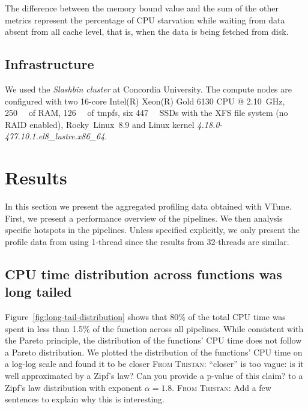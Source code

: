 \documentclass[conference]{IEEEtran}
\newcommand{\TG}[1]{\color{blue}\textsc{From Tristan: }#1\color{black}}
\begin{document}
The difference between the memory bound value and the sum of the other metrics represent the percentage of CPU starvation while waiting from data absent from all cache level, that is, when the data is being fetched from disk.
			
\subsection{Infrastructure}
We used the \textit{Slashbin cluster} at Concordia University. The compute nodes are configured with two 16-core Intel(R) Xeon(R) Gold 6130 CPU @ \SI{2.10}{\giga\hertz}, \SI{250}{\gibi\byte} of RAM, \SI{126}{\gibi\byte} of tmpfs, six \SI{447}{\gibi\byte} SSDs with the XFS file system (no RAID enabled), Rocky~Linux~8.9 and Linux kernel \textit{4.18.0-477.10.1.el8\_lustre.x86\_64}.
			
\section{Results}
In this section we present the aggregated profiling data obtained with VTune. First, we present a performance overview of the pipelines. We then analysis specific hotspots in the pipelines. Unless specified explicitly, we only present the profile data from using 1-thread since the results from 32-threads are similar.
			
\subsection{CPU time distribution across functions was long tailed}
Figure~\ref{fig:long-tail-distribution} shows that 80\% of the total CPU time was spent in less than 1.5\% of the function across all pipelines. While consistent with the Pareto principle, the distribution of the functions' CPU time does not follow a Pareto distribution. We plotted the distribution of the functions' CPU time on a log-log scale and found it to be closer \TG{``closer'' is too vague: is it well approximated by a Zipf's law? Can you provide a p-value of this claim?} to a Zipf's law distribution with exponent $\alpha=1.8$. \TG{Add a few sentences to explain why this is interesting.}
\end{document}
